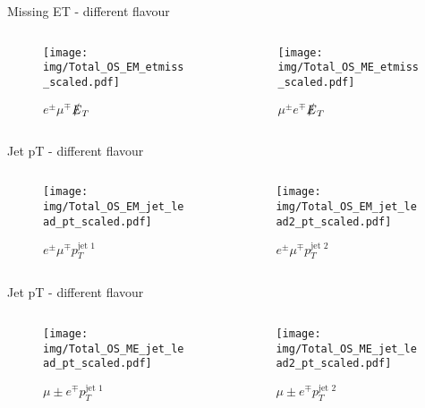 \documentclass{beamer}
\begin{document}
\begin{frame}{Missing ET - different flavour}
  \begin{columns}
    \begin{column}{0.45\textwidth}\begin{figure}
      \caption{$e^{\pm}\mu^{\mp}$$\slashed{E}_{T}$}
      \texttt{[image: img/Total\_OS\_EM\_etmiss\_scaled.pdf]}
    \end{figure}\end{column}
    \begin{column}{0.45\textwidth}\begin{figure}
      \caption{$\mu^{\pm}e^{\mp}$$\slashed{E}_{T}$}
      \texttt{[image: img/Total\_OS\_ME\_etmiss\_scaled.pdf]}
    \end{figure}\end{column}
  \end{columns}
\end{frame}

\begin{frame}{Jet pT - different flavour}
  \begin{columns}
    \begin{column}{0.45\textwidth}\begin{figure}
      \caption{$e^{\pm}\mu^{\mp}$$p_{T}^{\text{jet 1}}$}
      \texttt{[image: img/Total\_OS\_EM\_jet\_lead\_pt\_scaled.pdf]}
    \end{figure}\end{column}
    \begin{column}{0.45\textwidth}\begin{figure}
      \caption{$e^{\pm}\mu^{\mp}$$p_{T}^{\text{jet 2}}$}
      \texttt{[image: img/Total\_OS\_EM\_jet\_lead2\_pt\_scaled.pdf]}
    \end{figure}\end{column}
  \end{columns}
\end{frame}

\begin{frame}{Jet pT - different flavour}
  \begin{columns}
    \begin{column}{0.45\textwidth}\begin{figure}
      \caption{$\mu{\pm}e^{\mp}$$p_{T}^{\text{jet 1}}$}
      \texttt{[image: img/Total\_OS\_ME\_jet\_lead\_pt\_scaled.pdf]}
    \end{figure}\end{column}
    \begin{column}{0.45\textwidth}\begin{figure}
      \caption{$\mu{\pm}e^{\mp}$$p_{T}^{\text{jet 2}}$}
      \texttt{[image: img/Total\_OS\_ME\_jet\_lead2\_pt\_scaled.pdf]}
    \end{figure}\end{column}
  \end{columns}
\end{frame}
\end{document}
